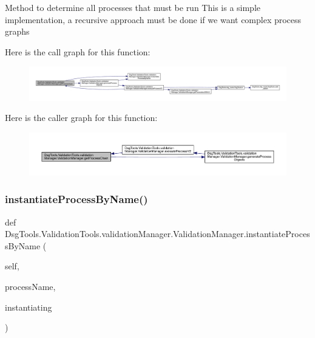 \begin{DoxyVerb}Method to determine all processes that must be run
This is a simple implementation, a recursive approach must be done if we want complex process graphs
\end{DoxyVerb}
 Here is the call graph for this function\+:
\nopagebreak
\begin{figure}[H]
\begin{center}
\leavevmode
\includegraphics[width=350pt]{class_dsg_tools_1_1_validation_tools_1_1validation_manager_1_1_validation_manager_a533bfcc682ca85c822147162426db5bd_cgraph}
\end{center}
\end{figure}
Here is the caller graph for this function\+:
\nopagebreak
\begin{figure}[H]
\begin{center}
\leavevmode
\includegraphics[width=350pt]{class_dsg_tools_1_1_validation_tools_1_1validation_manager_1_1_validation_manager_a533bfcc682ca85c822147162426db5bd_icgraph}
\end{center}
\end{figure}
\mbox{\label{class_dsg_tools_1_1_validation_tools_1_1validation_manager_1_1_validation_manager_ac3667c7214510a01bb6fa1b3825de13d}} 
\subsubsection{\texorpdfstring{instantiate\+Process\+By\+Name()}{instantiateProcessByName()}}
{\footnotesize\ttfamily def Dsg\+Tools.\+Validation\+Tools.\+validation\+Manager.\+Validation\+Manager.\+instantiate\+Process\+By\+Name (\begin{DoxyParamCaption}\item[{}]{self,  }\item[{}]{process\+Name,  }\item[{}]{instantiating }\end{DoxyParamCaption})}

